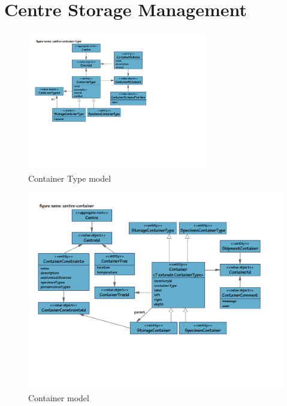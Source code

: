\chapter{Centre Storage Management}
\label{chap:centre-storage-management}

\begin{figure}[H]
  \centering
  \includegraphics[trim={10mm 75mm 92mm 18mm}, clip,
    width=0.7\textwidth]{images/centre-container-type}
  \caption{Container Type model}
  \label{fig:centre-container-type}
\end{figure}

\begin{figure}[H]
  \centering
  \includegraphics[trim={10mm 60mm 22mm 18mm}, clip,
    width=1\textwidth]{images/centre-container}
  \caption{Container model}
  \label{fig:centre-container}
\end{figure}

